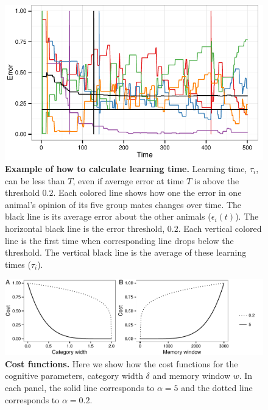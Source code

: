 \begin{figure}[ht]
\includegraphics[width=.8\textwidth]{figures/learning_time_example.pdf}
\caption{\label{learnT.ex} \sffamily\small\textbf{Example of how to calculate learning time.} Learning time, $\tau_i$, can be less than $T$, even if average error at time $T$ is above the threshold $0.2$. Each colored line shows how one the error in one animal's opinion of its five group mates changes over time. The black line is its average error about the other animals ($\epsilon_i(t)$). The horizontal black line is the error threshold, $0.2$. Each vertical colored line is the first time when corresponding line drops below the threshold. The vertical black line is the average of these learning times  ($\tau_i$).}
\end{figure}

\begin{figure}[ht]
\includegraphics[width=.8\textwidth]{figures/cost_functions.pdf}
\caption{\sffamily\small\textbf{Cost functions.} Here we show how the cost functions for the cognitive parameters, category width $\delta$ and memory window $w$. In each panel, the solid line corresponds to $\alpha=5$ and the dotted line corresponds to $\alpha=0.2$. }
\label{cost_fx}
\end{figure}

